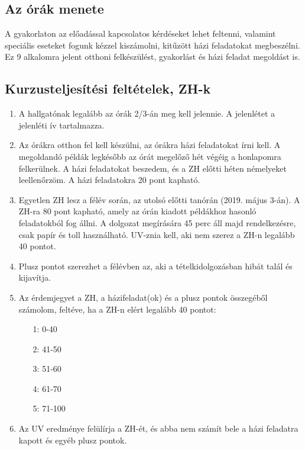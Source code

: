 \documentclass[12pt,a4paper]{scrartcl}
\begin{document}
\subsection{Az órák menete}
A gyakorlaton az előadással kapcsolatos kérdéseket lehet feltenni, valamint speciális eseteket fogunk kézzel kiszámolni, kitűzött házi feladatokat megbeszélni. Ez 9 alkalomra jelent otthoni felkészülést, gyakorlást és házi feladat megoldást is.

\iffalse %
\subsection{Kurzusteljesítési feltételek, ZH-k} %
\begin{enumerate}
\item A hallgatónak legalább az órák 2/3-án meg kell jelennie. A jelenlétet a jelenléti ív tartalmazza.
\item Az órákra otthon fel kell készülni, az órákra házi feladatokat írni kell. A megoldandó példák legkésőbb az órát megelőző hét végéig a honlapomra felkerülnek. A házi feladatokat beszedem, és a ZH előtti héten némelyeket leellenőrzöm. A házi feladatokra 20 pont kapható.
\item Egyetlen ZH lesz a félév során, az utolsó előtti tanórán (2019. május 3-án). A ZH-ra 80 pont kapható, amely az órán kiadott példákhoz hasonló feladatokból fog állni. A dolgozat megírására 45 perc áll majd rendelkezésre, csak papír és toll használható. UV-znia kell, aki nem szerez a ZH-n legalább 40 pontot.
\item Plusz pontot szerezhet a félévben az, aki a tételkidolgozásban hibát talál és kijavítja.
\item Az érdemjegyet a ZH, a házifeladat(ok) és a plusz pontok összegéből számolom, feltéve, ha a ZH-n elért legalább 40 pontot:
\begin{itemize}
\item[1:] 0-40
\item[2:] 41-50
\item[3:] 51-60
\item[4:] 61-70
\item[5:] 71-100
\end{itemize}

\item Az UV eredménye felülírja a ZH-ét, és abba nem számít bele a házi feladatra kapott és egyéb plusz pontok.
\end{enumerate}
\end{document}
